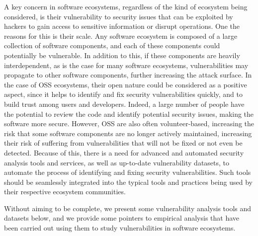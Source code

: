 A key concern in software ecosystems, regardless of the kind of ecosystem being considered, is their vulnerability to security issues that can be exploited by hackers to gain access to sensitive information or disrupt operations.
One the reasons for this is their scale. Any software ecosystem is composed of a large collection of software components, and each of these components could potentially be vulnerable. In addition to this, if these components are heavily interdependent, as is the case for many software ecosystems, vulnerabilities may propagate to other software components, further increasing the attack surface.
In the case of OSS ecosystems, their open nature could be considered as a positive aspect, since it helps to identify and fix security vulnerabilities quickly, and to build trust among users and developers. Indeed, a large number of people have the potential to review the code and identify potential security issues, making the software more secure.
However, OSS are also often volunteer-based, increasing the risk that some software components are no longer actively maintained, increasing their risk of suffering from vulnerabilities that will not be fixed or not even be detected.
Because of this, there is a need for advanced and automated security analysis tools and services, as well as up-to-date vulnerability datasets, to automate the process of identifying and fixing security vulnerabilities. Such tools should be seamlessly integrated into the typical tools and practices being used by their respective ecosystem communities.

Without aiming to be complete, we present some vulnerability analysis tools and datasets below, and we provide some pointers to empirical analysis that have been carried out using them to study vulnerabilities in software ecosystems.



